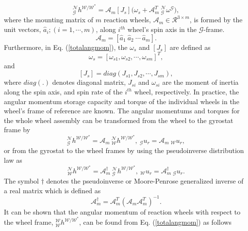 \documentclass[journal ]{new-aiaa}
\begin{document}
\begin{equation}\label{totalangmom}
_\mathcal{G}^\mathcal{N}h^{\mathcal{W}/\mathcal{W}^*}=\mathcal{A}_m[ J_{s}]\big( \omega_{s}+ \mathcal{A}_m^T\ _\mathcal{G}^\mathcal{N}\omega^{\mathcal{G}}),
\end{equation}
where the mounting matrix of $m$ reaction wheels, $\mathcal{A}_m\in \mathcal{R}^{3\times m}$, is formed  by the unit vectors, $\hat{a}_i; (i=1,\cdots, m)$, along $i^{th}$ wheel's spin axis in the $\mathcal{G}$-frame. 
\begin{equation}\label{mounting}
\mathcal{A}_m=[\hat{ a}_1\ \hat{ a}_2\ \cdots\ \hat{ a}_m].
\end{equation}
Furthermore, in Eq. (\ref{totalangmom}), the $\omega_s$ and $[J_s]$ are defined as
\begin{equation}\label{omegas}
\omega_s=[\omega_{s1}, \omega_{s2},\cdots,\omega_{sm}]^T,
\end{equation}
and
 \begin{equation}\label{js}
[J_{s}]=diag(J_{s1}, J_{s2},\cdots, J_{sm}),
\end{equation}
where $diag(.)$ denotes diagonal matrix, $J_{si}$ and $\omega_{si}$ are the moment of inertia along the spin axis, and spin rate of the $i^{th}$ wheel, respectively. In practice, the angular momentum storage capacity and torque of the individual wheels in the wheel's frame of reference are known. The angular momentums and torques for the whole wheel assembly can be transformed from the wheel to the gyrostat frame by
\begin{equation}\label{H_T_whl_gyro_frame}
_\mathcal{G}^\mathcal{N}h^{\mathcal{W}/\mathcal{W}^*}=\mathcal{A}_m\  _\mathcal{W}^\mathcal{N}h^{\mathcal{W}/\mathcal{W}^*},\  _\mathcal{G}u_r=\mathcal{A}_m\  _\mathcal{W}u_r,
\end{equation}
or from the gyrostat to the wheel frames by using the pseudoinverse distribution law as
\begin{equation}
_\mathcal{W}^\mathcal{N}h^{\mathcal{W}/\mathcal{W}^*}=\mathcal{A}_m^\dagger\  _\mathcal{G}^\mathcal{N}h^{\mathcal{W}/\mathcal{W}^*},\ _\mathcal{W}u_r=\mathcal{A}_m^\dagger\  _\mathcal{G}u_r.
\end{equation}
The symbol $\dagger$ denotes the pseudoinverse or Moore-Penrose generalized inverse of a real matrix which is defined as
\begin{equation}\label{Moore}
\mathcal{A}_m^\dagger=\mathcal{A}_m^T(\mathcal{A}_m \mathcal{A}_m^T)^{-1}.
\end{equation}
It can be shown that the angular momentum of reaction wheels with respect to the wheel frame, $_\mathcal{W}^\mathcal{W}h^{\mathcal{W}/\mathcal{W}^*}$, can be found from  Eq. (\ref{totalangmom}) as follows
\end{document}
